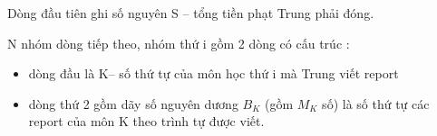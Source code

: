 Dòng đầu tiên ghi số nguyên S – tổng tiền phạt Trung phải đóng.


N nhóm dòng tiếp theo, nhóm thứ i gồm 2 dòng có cấu trúc :
\begin{itemize}
	\item dòng đầu là K– số thứ tự của môn học thứ i mà Trung viết report
	\item dòng thứ 2 gồm dãy số nguyên dương $B_{K}$ (gồm $M_{K}$ số) là số thứ tự các report của môn K theo trình tự được viết.
\end{itemize}